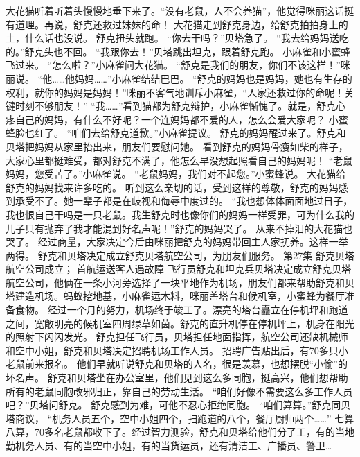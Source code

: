 \documentclass[a4paper,12pt,UTF8,twoside]{ctexbook}
\begin{document}
        大花猫听着听着头慢慢地垂下来了。“没有老鼠，人不会养猫”，他觉得咪丽这话挺有道理。再说，舒克还救过妹妹的命！ 
        大花猫走到舒克身边，给舒克拍拍身上的土，什么话也没说。 
        舒克扭头就跑。 
        “你去干吗？”贝塔急了。 
        “我去给妈妈送吃的。”舒克头也不回。 
        “我跟你去！”贝塔跳出坦克，跟着舒克跑。 
        小麻雀和小蜜蜂飞过来。 
        “怎么啦？”小麻雀问大花猫。 
        “舒克是我们的朋友，你们不该这样！”咪丽说。 
        “他……他妈妈……”小麻雀结结巴巴。 
        “舒克的妈妈也是妈妈，她也有生存的权利，就你的妈妈是妈妈！”咪丽不客气地训斥小麻雀，“人家还救过你的命呢！关键时刻不够朋友！” 
        “我……”看到猫都为舒克辩护，小麻雀惭愧了。就是，舒克心疼自己的妈妈，有什么不好呢？一个连妈妈都不爱的人，怎么会爱大家呢？ 
        小蜜蜂脸也红了。 
        “咱们去给舒克道歉。”小麻雀提议。 
        舒克的妈妈醒过来了。舒克和贝塔把妈妈从家里抬出来，朋友们要慰问她。 
        看到舒克的妈妈骨瘦如柴的样子，大家心里都挺难受，都对舒克不满了，他怎么早没想起照看自己的妈妈呢！ 
        “老鼠妈妈，您受苦了。”小麻雀说。 
        “老鼠妈妈，我们对不起您。”小蜜蜂说。 
        大花猫给舒克的妈妈找来许多吃的。 
        听到这么亲切的话，受到这样的尊敬，舒克的妈妈感到承受不了。她一辈子都是在歧视和侮辱中度过的。 
        “我也想体体面面地过日子，我也恨自己干吗是一只老鼠。我生舒克时也像你们的妈妈一样受罪，可为什么我的儿子只有抛弃了我才能混到好名声呢！”舒克的妈妈哭了。 
        从来不掉泪的大花猫也哭了。 
        经过商量，大家决定今后由咪丽把舒克的妈妈带回主人家抚养。这样一举两得。 
        舒克和贝塔决定成立舒克贝塔航空公司，为朋友们服务。   第27集 
        舒克贝塔航空公司成立； 
        首航运送客人遇故障   
        飞行员舒克和坦克兵贝塔决定成立舒克贝塔航空公司，他俩在一条小河旁选择了一块平地作为机场，朋友们都来帮助舒克和贝塔建造机场。蚂蚁挖地基，小麻雀运木料，咪丽盖塔台和候机室，小蜜蜂为餐厅准备食物。 
        经过一个月的努力，机场终于竣工了。漂亮的塔台矗立在停机坪和跑道之间，宽敞明亮的候机室四周绿草如茵。舒克的直升机停在停机坪上，机身在阳光的照射下闪闪发光。 
        舒克担任飞行员，贝塔担任地面指挥，航空公司还缺机械师和空中小姐，舒克和贝塔决定招聘机场工作人员。 
        招聘广告贴出后，有70多只小老鼠前来报名。 
        他们早就听说舒克和贝塔的人名，很是羡慕，也想摆脱“小偷”的坏名声。 
        舒克和贝塔坐在办公室里，他们见到这么多同胞，挺高兴，他们想帮助所有的老鼠同胞改邪归正，靠自己的劳动生活。 
        “咱们好像不需要这么多工作人员吧？”贝塔问舒克。 
        舒克感到为难，可他不忍心拒绝同胞。 
        “咱们算算。”舒克同贝塔商议，  “机务人员五个，空中小姐四个，扫跑道的八个，餐厅厨师两个……” 
        七算八算，70多名老鼠都收下了。经过智力测验，舒克和贝塔给他们分了工，有的当地勤机务人员、有的当空中小姐，有的当货运员，还有清洁工、广播员、警卫… 
\end{document}

